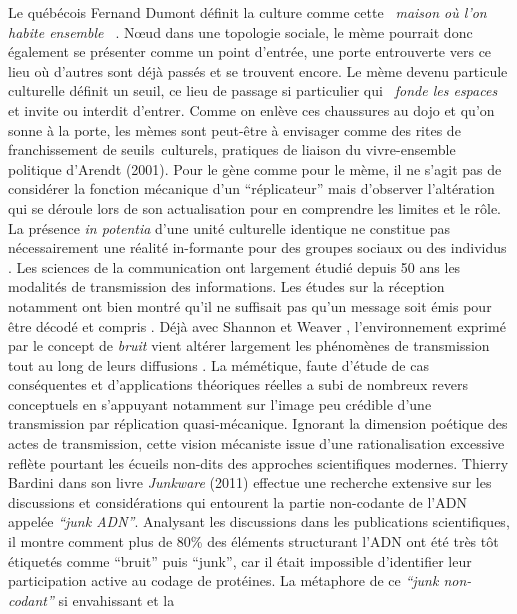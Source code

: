  Le qu\'eb\'ecois Fernand Dumont d\'efinit la culture comme cette \textit{{\guillemotleft}~maison o\`u l{\textquoteright}on habite ensemble~{\guillemotright} }\citep{Dumont1993}. N{\oe}ud dans une topologie sociale, le m\`eme pourrait donc \'egalement se pr\'esenter comme un point d{\textquoteright}entr\'ee, une porte entrouverte vers ce lieu o\`u d{\textquoteright}autres sont d\'ej\`a pass\'es et se trouvent encore. Le m\`eme devenu particule culturelle d\'efinit un seuil, ce lieu de passage si particulier qui \textit{{\guillemotleft}~fonde les espaces~{\guillemotright}} \citep{Bonnin2000} et invite ou interdit d{\textquoteright}entrer. Comme on enl\`eve ces chaussures au dojo et qu{\textquoteright}on sonne \`a la porte, les m\`emes sont peut-\^etre \`a envisager comme des rites de franchissement de seuils~culturels, pratiques de liaison du vivre-ensemble politique d{\textquoteright}Arendt (2001). Pour le g\`ene comme pour le m\`eme, il ne s{\textquoteright}agit pas de consid\'erer la fonction m\'ecanique d{\textquoteright}un {\textquotedblleft}r\'eplicateur{\textquotedblright} mais d{\textquoteright}observer l{\textquoteright}alt\'eration qui se d\'eroule lors de son actualisation pour en comprendre les limites et le r\^ole. La pr\'esence \textit{in potentia }d{\textquoteright}une unit\'e culturelle identique ne constitue pas n\'ecessairement une r\'ealit\'e in-formante pour des groupes sociaux ou des individus \citep{Lissack2004}. Les sciences de la communication ont largement \'etudi\'e depuis 50 ans les modalit\'es de transmission des informations. Les \'etudes sur la r\'eception notamment ont bien montr\'e qu{\textquoteright}il ne suffisait pas qu{\textquoteright}un message soit \'emis pour \^etre d\'ecod\'e et compris \citep{Katz1989}. D\'ej\`a avec Shannon et Weaver \citep{Jakobson1960}, l{\textquoteright}environnement exprim\'e par le concept de\textit{ bruit }vient alt\'erer largement les ph\'enom\`enes de transmission tout au long de leurs diffusions \citep{Chandler2008}. La m\'em\'etique, faute d{\textquoteright}\'etude de cas cons\'equentes et d{\textquoteright}applications th\'eoriques r\'eelles \citep{Jouxtel2014} a subi de nombreux revers conceptuels en s{\textquoteright}appuyant notamment sur l{\textquoteright}image peu cr\'edible d{\textquoteright}une transmission par r\'eplication quasi-m\'ecanique. Ignorant la dimension po\'etique des actes de transmission, cette vision m\'ecaniste issue d{\textquoteright}une rationalisation excessive refl\`ete pourtant les \'ecueils non-dits des approches scientifiques modernes. Thierry Bardini dans son livre \textit{Junkware }(2011) effectue une recherche extensive sur les discussions et consid\'erations qui entourent la partie non-codante de l{\textquoteright}ADN appel\'ee \textit{{\textquotedblleft}junk ADN{\textquotedblright}}. Analysant les discussions dans les publications scientifiques, il montre comment plus de 80\% des \'el\'ements structurant l{\textquoteright}ADN ont \'et\'e tr\`es t\^ot \'etiquet\'es comme {\textquotedblleft}bruit{\textquotedblright} puis {\textquotedblleft}junk{\textquotedblright}, car il \'etait impossible d{\textquoteright}identifier leur participation active au codage de prot\'eines. La m\'etaphore de ce \textit{{\textquotedblleft}junk non-codant{\textquotedblright} }si envahissant et la 